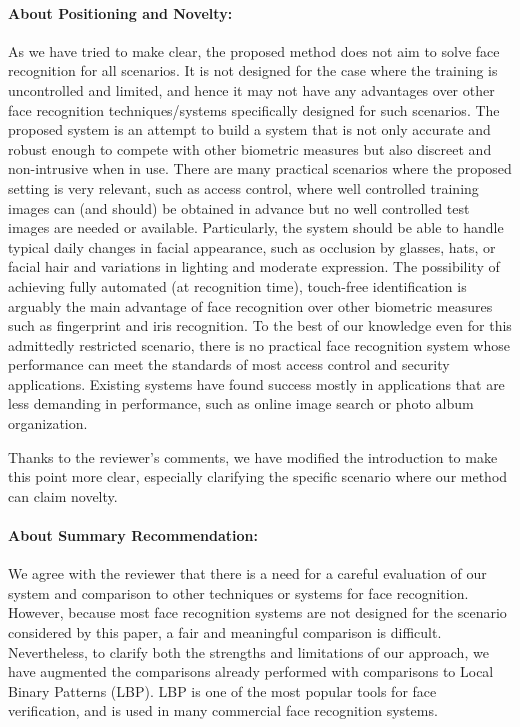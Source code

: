 \documentclass[11pt]{article}
\begin{document}
\paragraph{About Positioning and Novelty:} As we have tried to make clear, the
proposed method does not aim to solve face recognition for all scenarios. It is
not designed for the case where the training is uncontrolled and limited, and
hence it may not have any advantages over other face recognition
techniques/systems specifically designed for such scenarios.  The proposed
system is an attempt to build a system that is not only accurate and robust
enough to compete with other biometric measures but also discreet and
non-intrusive when in use. There are many practical scenarios where the
proposed setting is very relevant, such as access control, where well
controlled training images can (and should) be obtained in advance but no well
controlled test images are needed or available. Particularly, the system should
be able to handle typical daily changes in facial appearance, such as occlusion
by glasses, hats, or facial hair and variations in lighting and moderate
expression. The possibility of achieving fully automated (at recognition time),
touch-free identification is arguably the main advantage of face recognition
over other biometric measures such as fingerprint and iris recognition.  To the
best of our knowledge even for this admittedly restricted scenario, there is no
practical face recognition system whose performance can meet the standards of
most access control and security applications. Existing systems have found
success  mostly in applications that are less demanding in performance, such as
online image search or photo album organization.

Thanks to the reviewer's comments, we have modified the introduction to make this point more clear, especially clarifying the specific scenario where our method can claim novelty.

\paragraph{About Summary Recommendation:} We agree with the reviewer that there
is a need for a careful evaluation of our system and comparison to other
techniques or systems for face recognition. However, because most face
recognition systems are not designed for the scenario considered by this paper,
a fair and meaningful comparison is difficult. Nevertheless, to clarify both
the strengths and limitations of our approach, we have augmented the
comparisons already performed with comparisons to Local Binary Patterns
(LBP).  LBP is one of the most popular tools for face verification, and is used
in many commercial face recognition systems.
\end{document}
